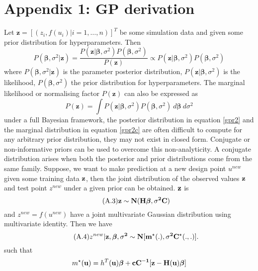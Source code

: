 \section*{Appendix 1: GP derivation}
Let $\mathbf{z}=[(z_i,f(u_i)|i=1,\ldots,n)]^T$ be some simulation data and given some prior distribution for hyperparameters. Then 
\begin{equation}\tag{A.1}\label{gpr2}
P(\boldsymbol\beta,\sigma^2|\mathbf{z})=\frac{P(\mathbf{z}|\boldsymbol\beta,\sigma^2) P(\boldsymbol\beta,\sigma^2)} {P(\mathbf{z})}\propto P(\mathbf{z}|\boldsymbol\beta,\sigma^2) P(\boldsymbol\beta,\sigma^2) 
\end{equation}
where $P(\boldsymbol\beta,\sigma^2|\mathbf{z})$ is the parameter posterior distribution, $P(\mathbf{z}|\boldsymbol\beta,\sigma^2)$ is the likelihood, $P(\boldsymbol\beta,\sigma^2)$ the prior distribution for hyperparameters. The marginal likelihood or normalising factor $P(\mathbf{z})$ can also be expressed as
\begin{equation}\tag{A.2}\label{gpr2c}
P(\mathbf{z})=\int P(\mathbf{z}|\boldsymbol\beta,\sigma^2) P(\boldsymbol\beta,\sigma^2)~ d\boldsymbol\beta ~d\sigma^2
\end{equation}
under a full Bayesian framework, the posterior distribution in equation \ref{gpr2} and the marginal distribution in equation \ref{gpr2c} are often difficult to compute for any arbitrary prior distribution, they may not exist in closed form. Conjugate or non-informative priors can be used to overcome this non-analyticity. A conjugate distribution arises when both the posterior and prior distributions come from the same family. %
Suppose, we want to make prediction at a new design point $u^{new}$ given some training data $\bf z$, then the joint distribution of the observed values $\bf z$ and test point $z^{new}$ under a given prior can be obtained. $\bf z$ is 
\begin{equation}\tag{A.3}\label{gpr0} 
\bf z\sim N(\bf H\boldsymbol \beta,\sigma^2\bf C)
\end{equation}
and $z^{new}=f(u^{new})$ have a joint multivariate Gaussian distribution using multivariate identity. Then we have
\begin{equation}\tag{A.4}\label{gpr2d}
z^{new}|\bf z, \boldsymbol\beta,\sigma^2 \sim N[m^{\star}(.),\sigma^2C^{\star}(.,.)].
\end{equation}
such that
$$m^{\star}(\mathbf{u})=h^{T}(\mathbf{u})\boldsymbol\beta+\bf cC^{-1}[z-H(u)\boldsymbol\beta]$$

